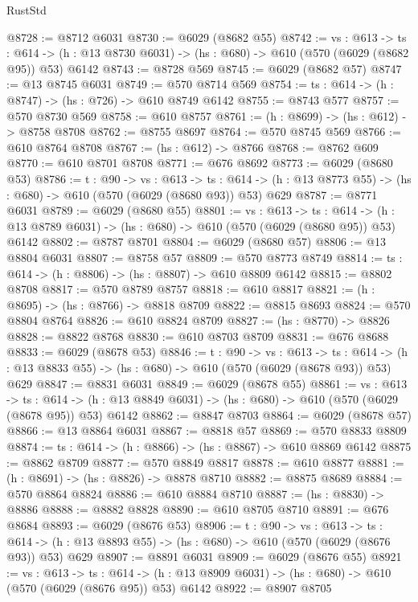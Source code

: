 \begin{lexlean}{RustStd}
\begin{coremodule}
@8728 := @8712 @6031
@8730 := @6029 (@8682 @55)
@8742 := {vs : @613} ->
  {ts : @614} -> (h : @13 @8730 @6031) -> (hs : @680) -> @610 (@570 (@6029 (@8682 @95)) @53) @6142
@8743 := @8728 @569
@8745 := @6029 (@8682 @57)
@8747 := @13 @8745 @6031
@8749 := @570 @8714 @569
@8754 := {ts : @614} -> (h : @8747) -> (hs : @726) -> @610 @8749 @6142
@8755 := @8743 @577
@8757 := @570 @8730 @569
@8758 := @610 @8757
@8761 := (h : @8699) -> (hs : @612) -> @8758 @8708
@8762 := @8755 @8697
@8764 := @570 @8745 @569
@8766 := @610 @8764 @8708
@8767 := (hs : @612) -> @8766
@8768 := @8762 @609
@8770 := @610 @8701 @8708
@8771 := @676 @8692
@8773 := @6029 (@8680 @53)
@8786 := {t : @90} ->
  {vs : @613} ->
  {ts : @614} -> (h : @13 @8773 @55) -> (hs : @680) -> @610 (@570 (@6029 (@8680 @93)) @53) @629
@8787 := @8771 @6031
@8789 := @6029 (@8680 @55)
@8801 := {vs : @613} ->
  {ts : @614} -> (h : @13 @8789 @6031) -> (hs : @680) -> @610 (@570 (@6029 (@8680 @95)) @53) @6142
@8802 := @8787 @8701
@8804 := @6029 (@8680 @57)
@8806 := @13 @8804 @6031
@8807 := @8758 @57
@8809 := @570 @8773 @8749
@8814 := {ts : @614} -> (h : @8806) -> (hs : @8807) -> @610 @8809 @6142
@8815 := @8802 @8708
@8817 := @570 @8789 @8757
@8818 := @610 @8817
@8821 := (h : @8695) -> (hs : @8766) -> @8818 @8709
@8822 := @8815 @8693
@8824 := @570 @8804 @8764
@8826 := @610 @8824 @8709
@8827 := (hs : @8770) -> @8826
@8828 := @8822 @8768
@8830 := @610 @8703 @8709
@8831 := @676 @8688
@8833 := @6029 (@8678 @53)
@8846 := {t : @90} ->
  {vs : @613} ->
  {ts : @614} -> (h : @13 @8833 @55) -> (hs : @680) -> @610 (@570 (@6029 (@8678 @93)) @53) @629
@8847 := @8831 @6031
@8849 := @6029 (@8678 @55)
@8861 := {vs : @613} ->
  {ts : @614} -> (h : @13 @8849 @6031) -> (hs : @680) -> @610 (@570 (@6029 (@8678 @95)) @53) @6142
@8862 := @8847 @8703
@8864 := @6029 (@8678 @57)
@8866 := @13 @8864 @6031
@8867 := @8818 @57
@8869 := @570 @8833 @8809
@8874 := {ts : @614} -> (h : @8866) -> (hs : @8867) -> @610 @8869 @6142
@8875 := @8862 @8709
@8877 := @570 @8849 @8817
@8878 := @610 @8877
@8881 := (h : @8691) -> (hs : @8826) -> @8878 @8710
@8882 := @8875 @8689
@8884 := @570 @8864 @8824
@8886 := @610 @8884 @8710
@8887 := (hs : @8830) -> @8886
@8888 := @8882 @8828
@8890 := @610 @8705 @8710
@8891 := @676 @8684
@8893 := @6029 (@8676 @53)
@8906 := {t : @90} ->
  {vs : @613} ->
  {ts : @614} -> (h : @13 @8893 @55) -> (hs : @680) -> @610 (@570 (@6029 (@8676 @93)) @53) @629
@8907 := @8891 @6031
@8909 := @6029 (@8676 @55)
@8921 := {vs : @613} ->
  {ts : @614} -> (h : @13 @8909 @6031) -> (hs : @680) -> @610 (@570 (@6029 (@8676 @95)) @53) @6142
@8922 := @8907 @8705

\end{coremodule}
\end{lexlean}
